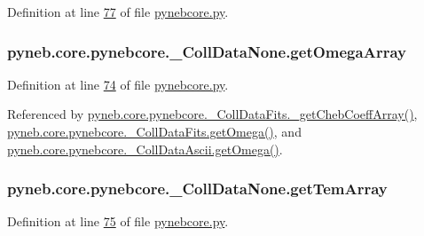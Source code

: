 Definition at line \hyperlink{pynebcore_8py_source_l00077}{77} of file \hyperlink{pynebcore_8py_source}{pynebcore.\-py}.

\hypertarget{classpyneb_1_1core_1_1pynebcore_1_1___coll_data_none_a9945656d527d539b02443f1e12175952}{
\subsubsection[{get\-Omega\-Array}]{\setlength{\rightskip}{0pt plus 5cm}pyneb.\-core.\-pynebcore.\-\_\-\-Coll\-Data\-None.\-get\-Omega\-Array}}\label{classpyneb_1_1core_1_1pynebcore_1_1___coll_data_none_a9945656d527d539b02443f1e12175952}


Definition at line \hyperlink{pynebcore_8py_source_l00074}{74} of file \hyperlink{pynebcore_8py_source}{pynebcore.\-py}.



Referenced by \hyperlink{pynebcore_8py_source_l00751}{pyneb.\-core.\-pynebcore.\-\_\-\-Coll\-Data\-Fits.\-\_\-get\-Cheb\-Coeff\-Array()}, \hyperlink{pynebcore_8py_source_l00828}{pyneb.\-core.\-pynebcore.\-\_\-\-Coll\-Data\-Fits.\-get\-Omega()}, and \hyperlink{pynebcore_8py_source_l01082}{pyneb.\-core.\-pynebcore.\-\_\-\-Coll\-Data\-Ascii.\-get\-Omega()}.

\hypertarget{classpyneb_1_1core_1_1pynebcore_1_1___coll_data_none_a75bd94e0404dbdad86ce0cd849331b6d}{
\subsubsection[{get\-Tem\-Array}]{\setlength{\rightskip}{0pt plus 5cm}pyneb.\-core.\-pynebcore.\-\_\-\-Coll\-Data\-None.\-get\-Tem\-Array}}\label{classpyneb_1_1core_1_1pynebcore_1_1___coll_data_none_a75bd94e0404dbdad86ce0cd849331b6d}


Definition at line \hyperlink{pynebcore_8py_source_l00075}{75} of file \hyperlink{pynebcore_8py_source}{pynebcore.\-py}.



